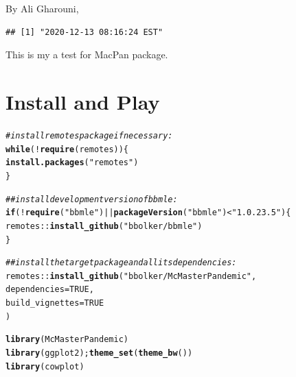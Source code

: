 \documentclass{article}\usepackage[]{graphicx}\usepackage[]{color}
\makeatletter
\newcommand{\hlnum}[1]{\textcolor[rgb]{0.686,0.059,0.569}{#1}}%
\newcommand{\hlstr}[1]{\textcolor[rgb]{0.192,0.494,0.8}{#1}}%
\newcommand{\hlcom}[1]{\textcolor[rgb]{0.678,0.584,0.686}{\textit{#1}}}%
\newcommand{\hlopt}[1]{\textcolor[rgb]{0,0,0}{#1}}%
\newcommand{\hlstd}[1]{\textcolor[rgb]{0.345,0.345,0.345}{#1}}%
\newcommand{\hlkwa}[1]{\textcolor[rgb]{0.161,0.373,0.58}{\textbf{#1}}}%
\newcommand{\hlkwc}[1]{\textcolor[rgb]{0.333,0.667,0.333}{#1}}%
\newcommand{\hlkwd}[1]{\textcolor[rgb]{0.737,0.353,0.396}{\textbf{#1}}}%
\newenvironment{kframe}{%
 \def\at@end@of@kframe{}%
 \ifinner\ifhmode%
  \def\at@end@of@kframe{\end{minipage}}%
  \begin{minipage}{\columnwidth}%
 \fi\fi%
 \def\FrameCommand##1{\hskip\@totalleftmargin \hskip-\fboxsep
 \colorbox{shadecolor}{##1}\hskip-\fboxsep
     \hskip-\linewidth \hskip-\@totalleftmargin \hskip\columnwidth}%
 \MakeFramed {\advance\hsize-\width
   \@totalleftmargin\z@ \linewidth\hsize
   \@setminipage}}%
 {\par\unskip\endMakeFramed%
 \at@end@of@kframe}
\newenvironment{knitrout}{}{} %
\makeatother
\begin{document}
By Ali Gharouni,
\begin{knitrout}
\color{fgcolor}\begin{kframe}
\begin{verbatim}
## [1] "2020-12-13 08:16:24 EST"
\end{verbatim}
\end{kframe}
\end{knitrout}
This is my a test for MacPan package.

\section{Install and Play}

\begin{knitrout}
\color{fgcolor}\begin{kframe}
\begin{alltt}
\hlcom{# install remotes package if necessary:}
\hlkwa{while} \hlstd{(}\hlopt{!}\hlkwd{require}\hlstd{(remotes)) \{}
    \hlkwd{install.packages}\hlstd{(}\hlstr{"remotes"}\hlstd{)}
\hlstd{\}}
\end{alltt}


{\ttfamily\noindent\itshape\color{messagecolor}{\#\# Loading required package: remotes}}\begin{alltt}
\hlcom{## install development version of bbmle:}
\hlkwa{if} \hlstd{(}\hlopt{!}\hlkwd{require}\hlstd{(}\hlstr{"bbmle"}\hlstd{)} \hlopt{||} \hlkwd{packageVersion}\hlstd{(}\hlstr{"bbmle"}\hlstd{)} \hlopt{<} \hlstr{"1.0.23.5"}\hlstd{) \{}
    \hlstd{remotes}\hlopt{::}\hlkwd{install_github}\hlstd{(}\hlstr{"bbolker/bbmle"}\hlstd{)}
\hlstd{\}}
\end{alltt}


{\ttfamily\noindent\itshape\color{messagecolor}{\#\# Loading required package: bbmle}}

{\ttfamily\noindent\itshape\color{messagecolor}{\#\# Loading required package: stats4}}\begin{alltt}
\hlcom{## install the target package and all its dependencies:}
\hlstd{remotes}\hlopt{::}\hlkwd{install_github}\hlstd{(}\hlstr{"bbolker/McMasterPandemic"}\hlstd{,}
                        \hlkwc{dependencies} \hlstd{=} \hlnum{TRUE}\hlstd{,}
                        \hlkwc{build_vignettes} \hlstd{=} \hlnum{TRUE}
\hlstd{)}
\end{alltt}


{\ttfamily\noindent\itshape\color{messagecolor}{\#\# Skipping install of 'McMasterPandemic' from a github remote, the SHA1 (54095dc4) has not changed since last install.\\\#\#\ \  Use `force = TRUE` to force installation}}\begin{alltt}
\hlkwd{library}\hlstd{(McMasterPandemic)}
\hlkwd{library}\hlstd{(ggplot2);} \hlkwd{theme_set}\hlstd{(}\hlkwd{theme_bw}\hlstd{())}
\hlkwd{library}\hlstd{(cowplot)}


\end{alltt}
\end{kframe}
\end{knitrout}
\end{document}
